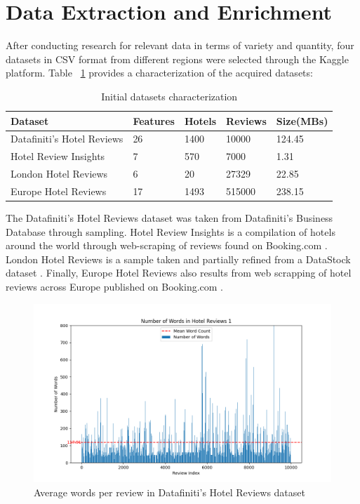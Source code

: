 \documentclass[sigconf]{acmart}
\begin{document}
\section{Data Extraction and Enrichment}

After conducting research for relevant data in terms of variety and quantity, four datasets in CSV format from different regions were selected through the Kaggle \cite{kaggle} platform. Table ~\ref{tab:initFreq} provides a characterization of the acquired datasets:

\begin{table}[h]
\small
\caption{Initial datasets characterization}
\label{tab:initFreq}
\begin{tabular}{lllll}
\toprule
Dataset & Features & Hotels & Reviews & Size(MBs)\\
\midrule
Datafiniti's Hotel Reviews & 26 & 1400 & 10000 & 124.45 \\
Hotel Review Insights & 7 & 570 & 7000 & 1.31 \\
London Hotel Reviews & 6 & 20 & 27329 & 22.85 \\
Europe Hotel Reviews & 17 & 1493 & 515000 & 238.15 \\
\bottomrule
\end{tabular}
\end{table}


The Datafiniti's Hotel Reviews \cite{Datafiniti's_Hotel_Reviews} dataset was taken from Datafiniti's Business Database \cite{Datafiniti's_Business_Database} through sampling. Hotel Review Insights \cite{Hotel_Review_Insights} is a compilation of hotels around the world through web-scraping of reviews found on Booking.com \cite{Booking}. London Hotel Reviews \cite{London_Hotel_Reviews} is a sample taken and partially refined from a DataStock dataset \cite{DataStock}. Finally, Europe Hotel Reviews \cite{Europe_Hotel_Reviews} also results from web scrapping of hotel reviews across Europe published on Booking.com \cite{Booking}.

\begin{figure}[H]
  \centering
  \includegraphics[width=\linewidth]{imgs/word_count_1.png}
  \caption{Average words per review in Datafiniti's Hotel Reviews dataset}
  \label{fig:reviewWords1}
\end{figure}
\end{document}
